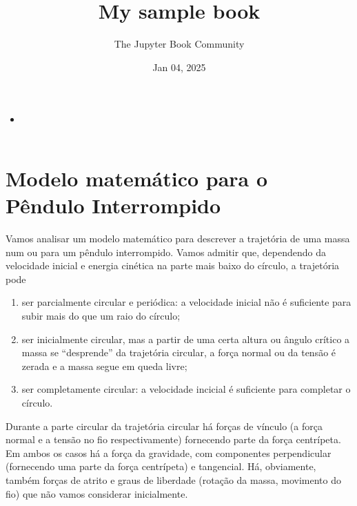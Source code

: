 \documentclass[letterpaper,10pt,english]{jupyterBook}
\title{My sample book}
\date{Jan 04, 2025}
\author{The Jupyter Book Community}
\begin{document}
\pagestyle{empty}
\sphinxmaketitle
\pagestyle{plain}
\sphinxtableofcontents
\pagestyle{normal}
\label{\detokenize{intro::doc}}



\begin{itemize}
\item {} 
\sphinxAtStartPar
{\hyperref[\detokenize{modelo::doc}]{}}

\end{itemize}

\sphinxstepscope


\chapter{Modelo matemático para o Pêndulo Interrompido}
\label{\detokenize{modelo:modelo-matematico-para-o-pendulo-interrompido}}\label{\detokenize{modelo::doc}}
\sphinxAtStartPar
Vamos analisar um modelo matemático para descrever a trajetória de uma massa num  ou para um pêndulo interrompido. Vamos admitir que, dependendo da velocidade inicial e energia cinética na parte mais baixo do círculo, a trajetória pode
\begin{enumerate}
%
\item {} 
\sphinxAtStartPar
ser parcialmente circular e periódica: a velocidade inicial não é suficiente para subir mais do que um raio do círculo;

\item {} 
\sphinxAtStartPar
ser inicialmente circular, mas a partir de uma certa altura ou ângulo crítico a massa se “desprende” da trajetória circular, a força normal ou da tensão é zerada e a massa segue em queda livre;

\item {} 
\sphinxAtStartPar
ser completamente circular: a velocidade incicial é suficiente para completar o círculo.

\end{enumerate}

\sphinxAtStartPar
Durante a parte circular da trajetória circular há forças de vínculo (a força normal e a tensão no fio respectivamente) fornecendo parte da força centrípeta. Em ambos os casos há a força da gravidade, com componentes perpendicular (fornecendo uma parte da força centrípeta) e tangencial. Há, obviamente, também forças de atrito e graus de liberdade (rotação da massa, movimento do fio) que não vamos considerar inicialmente.
\end{document}
